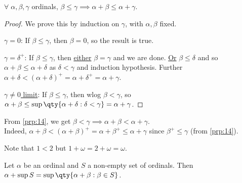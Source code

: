 \begin{proposition} \label{prp:14}
    $\forall \; \alpha, \beta, \gamma$ ordinals, $\beta \leq \gamma \implies \alpha + \beta \leq \alpha + \gamma$.
\end{proposition}

\begin{proof}
    We prove this by induction on $\gamma$, with $\alpha, \beta$ fixed.

    \underline{$\gamma = 0$}: If $\beta \leq \gamma$, then $\beta = 0$, so the result is true.

    \underline{$\gamma = \delta^+$}: If $\beta \leq \gamma$, then \underline{either} $\beta = \gamma$ and we are done.
    \underline{Or} $\beta \leq \delta$ and so $\alpha + \beta \leq \alpha + \delta$ as $\delta < \gamma$ and induction hypothesis.
    Further $\alpha + \delta < (\alpha + \delta)^+ = \alpha + \delta^+ = \alpha + \gamma$.

    \underline{$\gamma \neq 0$ limit}: If $\beta \leq \gamma$, then wlog $\beta < \gamma$, so $\alpha + \beta \leq \sup \qty{\alpha + \delta : \delta < \gamma} = \alpha + \gamma$.
\end{proof}

\begin{remark}
    From \cref{prp:14}, we get $\beta < \gamma \implies \alpha + \beta < \alpha + \gamma$. \\
    Indeed, $\alpha + \beta < (\alpha + \beta)^+ = \alpha + \beta^+ \leq \alpha + \gamma$ since $\beta^+ \leq \gamma$ (from \cref{prp:14}).

    Note that $1 < 2$ but $1 + \omega = 2 + \omega = \omega$.
\end{remark}

\begin{lemma} \label{lem:15}
    Let $\alpha$ be an ordinal and $S$ a non-empty set of ordinals.
    Then $\alpha + \sup S = \sup \qty{\alpha + \beta : \beta \in S}$.
\end{lemma}

